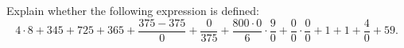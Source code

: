 Explain whether the following expression is defined:\[4\cdot 8+345+725+365+\dfrac{375-375}{0}+\dfrac{0}{375}+\dfrac{800\cdot 0}{6}\cdot\dfrac{9}{0}+\dfrac{0}{0}\cdot\dfrac{0}{0}+1+1+\dfrac{4}{0}+59.\]
